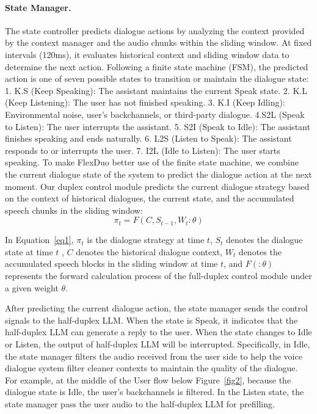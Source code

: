 \documentclass[11pt]{article}
\begin{document}
\paragraph{State Manager.}
The state controller predicts dialogue actions by analyzing the context provided by the context manager and the audio chunks within the sliding window. At fixed intervals (120ms), it evaluates historical context and sliding window data to determine the next action. Following a finite state machine (FSM), the predicted action is one of seven possible states to transition or maintain the dialogue state: 1. K.S (Keep Speaking): The assistant maintains the current Speak state. 2. K.L (Keep Listening): The user has not finished speaking. 3. K.I (Keep Idling): Environmental noise, user's backchannels, or third-party dialogue. 4.S2L (Speak to Listen): The user interrupts the assistant. 5. S2I (Speak to Idle): The assistant finishes speaking and ends naturally. 6. L2S (Listen to Speak): The assistant responds to or interrupts the user. 7. I2L (Idle to Listen): The user starts speaking.
To make FlexDuo better use of the finite state machine, we combine the current dialogue state of the system to predict the dialogue action at the next moment. Our duplex control module predicts the current dialogue strategy based on the context of historical dialogues, the current state, and the accumulated speech chunks in the sliding window:
\begin{equation}
  \pi_t = F(C, S_{t-1}, W_t:\theta)
\label{eq1}
\end{equation}

In Equation~\ref{eq1}, $\pi_t$ is the dialogue strategy at time $t$, $S_t$ denotes the dialogue state at time $t$ , $C$ denotes the historical dialogue context, $W_t$ denotes the accumulated speech blocks in the sliding window at time $t$, and $F(:\theta)$ represents the forward calculation process of the full-duplex control module under a given weight $\theta$.

After predicting the current dialogue action, the state manager sends the control signals to the half-duplex LLM. When the state is Speak, it indicates that the half-duplex LLM can generate a reply to the user. When the state changes to Idle or Listen, the output of half-duplex LLM will be interrupted. Specifically, in Idle, the state manager filters the audio received from the user side to help the voice dialogue system filter cleaner contexts to maintain the quality of the dialogue. For example, at the middle of the User flow below Figure~\ref{fig2}, because the dialogue state is Idle, the user's backchannels is filtered. In the Listen state, the state manager 
pass the user audio to the half-duplex LLM for prefilling.
\end{document}
